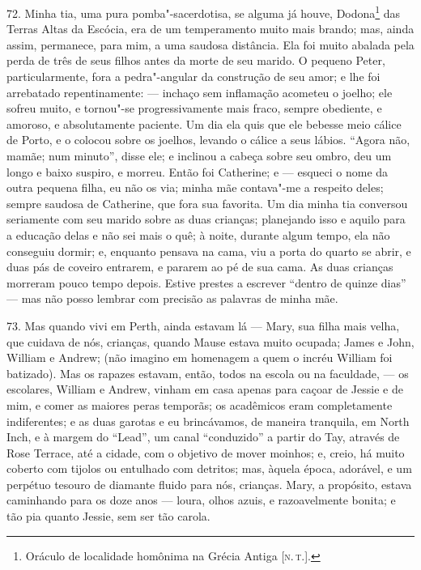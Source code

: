 72. Minha tia, uma pura pomba"-sacerdotisa, se alguma já houve,
Dodona\footnote{Oráculo de localidade homônima na Grécia Antiga {[}\textsc{n.\,t.}{]}.} das Terras Altas da Escócia, era de um temperamento muito mais
brando; mas, ainda assim, permanece, para mim, a uma saudosa distância.
Ela foi muito abalada pela perda de três de seus filhos antes da morte
de seu marido. O pequeno Peter, particularmente, fora a pedra"-angular da
construção de seu amor; e lhe foi arrebatado repentinamente: --- inchaço
sem inflamação acometeu o joelho; ele sofreu muito, e tornou"-se
progressivamente mais fraco, sempre obediente, e amoroso, e
absolutamente paciente. Um dia ela quis que ele bebesse meio cálice de
Porto, e o colocou sobre os joelhos, levando o cálice a seus lábios.
``Agora não, mamãe; num minuto'', disse ele; e inclinou a cabeça sobre
seu ombro, deu um longo e baixo suspiro, e morreu. Então foi Catherine;
e --- esqueci o nome da outra pequena filha, eu não os via; minha mãe
contava"-me a respeito deles; sempre saudosa de Catherine, que fora sua
favorita. Um dia minha tia conversou seriamente com seu marido sobre as
duas crianças; planejando isso e aquilo para a educação delas e não sei
mais o quê; à noite, durante algum tempo, ela não conseguiu dormir; e,
enquanto pensava na cama, viu a porta do quarto se abrir, e duas pás de
coveiro entrarem, e pararem ao pé de sua cama. As duas crianças morreram
pouco tempo depois. Estive prestes a escrever ``dentro de quinze dias''
--- mas não posso lembrar com precisão as palavras de minha mãe.

73. Mas quando vivi em Perth, ainda estavam lá --- Mary, sua filha mais
velha, que cuidava de nós, crianças, quando Mause estava muito ocupada;
James e John, William e Andrew; (não imagino em homenagem a quem o
incréu William foi batizado). Mas os rapazes estavam, então, todos na
escola ou na faculdade, --- os escolares, William e Andrew, vinham em
casa apenas para caçoar de Jessie e de mim, e comer as maiores peras
temporãs; os acadêmicos eram completamente indiferentes; e as duas
garotas e eu brincávamos, de maneira tranquila, em North Inch, e à
margem do ``Lead'', um canal ``conduzido'' a partir do Tay, através de
Rose Terrace, até a cidade, com o objetivo de mover moinhos; e, creio,
há muito coberto com tijolos ou entulhado com detritos; mas, àquela
época, adorável, e um perpétuo tesouro de diamante fluido para nós,
crianças. Mary, a propósito, estava caminhando para os doze anos ---
loura, olhos azuis, e razoavelmente bonita; e tão pia quanto Jessie, sem
ser tão carola.

